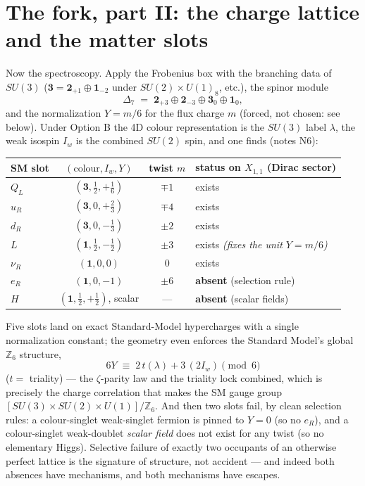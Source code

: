 \documentclass[11pt]{article}
\newcommand{\X}{X_{1,1}}
\newcommand{\Z}{\mathbb{Z}}
\newcommand{\Iw}{I_w}
\begin{document}
\section{The fork, part II: the charge lattice and the matter slots}

Now the spectroscopy. Apply the Frobenius box with the branching data of $SU(3)$
($\mathbf 3 = \mathbf 2_{+1}\oplus\mathbf 1_{-2}$ under $SU(2)\times U(1)_8$, etc.), the
spinor module
\[
\Delta_7 \;=\; \mathbf 2_{+3}\oplus\mathbf 2_{-3}\oplus\mathbf 3_0\oplus\mathbf 1_0 ,
\]
and the normalization $Y=m/6$ for the flux charge $m$ (forced, not chosen: see below).
Under Option B the 4D colour representation is the $SU(3)$ label $\lambda$, the weak isospin
$\Iw$ is the combined $SU(2)$ spin, and one finds (notes N6):

\begin{center}
\begin{tabular}{lccl}
\toprule
SM slot & $(\text{colour},\Iw,Y)$ & twist $m$ & status on $\X$ (Dirac sector)\\
\midrule
$Q_L$ & $(\mathbf 3,\tfrac12,+\tfrac16)$ & $\mp1$ & exists\\
$u_R$ & $(\mathbf 3,0,+\tfrac23)$ & $\mp4$ & exists\\
$d_R$ & $(\mathbf 3,0,-\tfrac13)$ & $\pm2$ & exists\\
$L$ & $(\mathbf 1,\tfrac12,-\tfrac12)$ & $\pm3$ & exists \emph{(fixes the unit $Y=m/6$)}\\
$\nu_R$ & $(\mathbf 1,0,0)$ & $0$ & exists\\
$e_R$ & $(\mathbf 1,0,-1)$ & $\pm6$ & \textbf{absent} (selection rule)\\
$H$ & $(\mathbf 1,\tfrac12,+\tfrac12)$, scalar & --- & \textbf{absent} (scalar fields)\\
\bottomrule
\end{tabular}
\end{center}

Five slots land on exact Standard-Model hypercharges with a single normalization constant;
the geometry even enforces the Standard Model's global $\mathbb Z_6$ structure,
\begin{equation}
6Y \;\equiv\; 2\,t(\lambda) + 3\,(2\Iw) \pmod 6
\end{equation}
($t=$ triality) --- the $\zeta$-parity law and the triality lock combined, which is precisely
the charge correlation that makes the SM gauge group $[SU(3)\times SU(2)\times U(1)]/\Z_6$.
And then two slots fail, by clean selection rules: a colour-singlet weak-singlet fermion is
pinned to $Y=0$ (so no $e_R$), and a colour-singlet weak-doublet \emph{scalar field} does not
exist for any twist (so no elementary Higgs). Selective failure of exactly two occupants of
an otherwise perfect lattice is the signature of structure, not accident --- and indeed both
absences have mechanisms, and both mechanisms have escapes.
\end{document}
